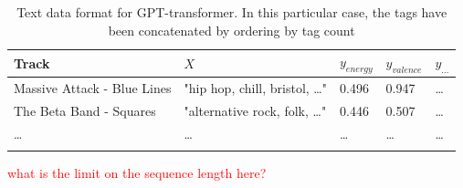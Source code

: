 \documentclass[sn-mathphys]{sn-jnl}%
\theoremstyle{thmstyleone}%
\theoremstyle{thmstyletwo}%
\theoremstyle{thmstylethree}%
\begin{document}
\begin{table}[h]
      \begin{center}
      \begin{minipage}{\textwidth}
      \caption{Text data format for GPT-transformer. In this particular case, the tags have been concatenated by ordering by tag count}\label{text_format}%
      \begin{tabular}{@{}lllll@{}}
      \toprule
      Track                         & $X$                                   & $y_{energy}$ & $y_{valence}$ & $y_{\dots}$ \\
      \midrule
      Massive Attack - Blue Lines   & "hip hop, chill, bristol, \dots"      & 0.496        & 0.947         & \dots  \\
      The Beta Band - Squares       & "alternative rock, folk, \dots"       & 0.446        & 0.507         & \dots \\
      \dots                         & \dots                                 & \dots        & \dots         & \dots  \\
      \botrule
      \end{tabular}
      \end{minipage}
      \end{center}
\end{table}


\textcolor{red}{what is the limit on the sequence length here?}



\end{document}
